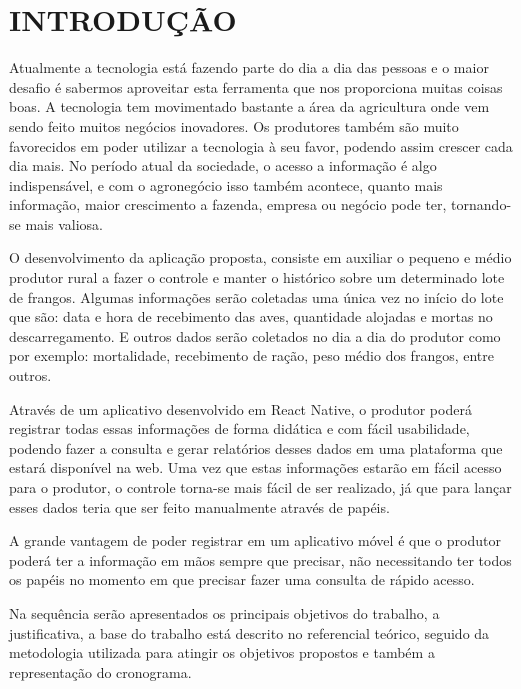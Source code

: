 
\chapter{INTRODUÇÃO}
\label{chap:introducao}


Atualmente a tecnologia está fazendo parte do dia a dia das pessoas e o maior desafio é sabermos aproveitar esta ferramenta que nos proporciona muitas coisas boas. A tecnologia tem movimentado bastante a área da agricultura onde vem sendo feito muitos negócios inovadores. Os produtores também são muito favorecidos em poder utilizar a tecnologia à seu favor, podendo assim crescer cada dia mais. 
No período atual da sociedade, o acesso a informação é algo indispensável, e com o agronegócio isso também acontece, quanto mais informação, maior crescimento a fazenda, empresa ou negócio pode ter, tornando-se mais valiosa. 

O desenvolvimento da aplicação proposta, consiste em auxiliar o pequeno e médio produtor rural a fazer o controle e manter o histórico sobre um determinado lote de frangos. Algumas informações serão coletadas uma única vez no início do lote que são: data e hora de recebimento das aves, quantidade alojadas e mortas no descarregamento. E outros dados serão coletados no dia a dia do produtor como por exemplo: mortalidade, recebimento de ração, peso médio dos frangos, entre outros.

Através de um aplicativo desenvolvido em React Native, o produtor poderá registrar todas essas informações de forma didática e com fácil usabilidade, podendo fazer a consulta e gerar relatórios desses dados em uma plataforma que estará disponível na web.
Uma vez que estas informações estarão em fácil acesso para o produtor, o controle torna-se mais fácil de ser realizado, já que para lançar esses dados teria que ser feito manualmente através de papéis.

A grande vantagem de poder registrar em um aplicativo móvel é que o produtor poderá ter a informação em mãos sempre que precisar, não necessitando ter todos os papéis no momento em que precisar fazer uma consulta de rápido acesso.

Na sequência serão apresentados os principais objetivos do trabalho, a justificativa, a base do trabalho está descrito no referencial teórico, seguido da metodologia utilizada para atingir os objetivos propostos e também a representação do cronograma.